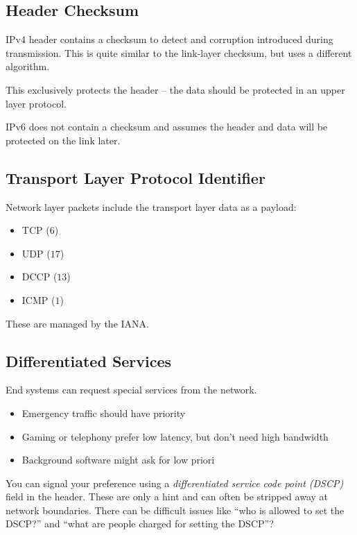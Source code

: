 \subsection{Header Checksum}\label{sub:header_checksum}

IPv4 header contains a checksum to detect and corruption introduced during transmission.
This is quite similar to the link-layer checksum, but uses a different algorithm.
\begin{note}
	This exclusively protects the header -- the data should be protected in an upper layer protocol.
\end{note}
\noindent
IPv6 does not contain a checksum and assumes the header and data will be protected on the link later.

\subsection{Transport Layer Protocol Identifier}\label{sub:transport_layer_protocol_identifier}

Network layer packets include the transport layer data as a payload:
\begin{itemize}
	\item TCP (\(6\))
	\item UDP (\(17\))
	\item DCCP (\(13\))
	\item ICMP (\(1\))
\end{itemize}
These are managed by the IANA.

\subsection{Differentiated Services}\label{sub:differentiated_services}

End systems can request special services from the network.
\begin{itemize}
	\item Emergency traffic should have priority
	\item Gaming or telephony prefer low latency, but don't need high bandwidth
	\item Background software might ask for low priori
\end{itemize}
You can signal your preference using a \emph{differentiated service code point (DSCP)} field in the header.
These are only a hint and can often be stripped away at network boundaries.
There can be difficult issues like ``who is allowed to set the DSCP?'' and ``what are people charged for setting the DSCP''?

